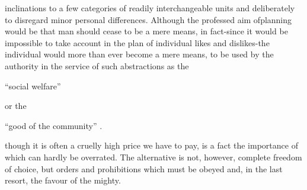 \documentclass[11pt,openany]{book}
\begin{document}
inclinations to a few categories of readily interchangeable units and deliberately to disregard minor personal differences. Although the professed aim ofplanning would be that man should cease to be a mere means, in fact-since it would be impossible to take account in the plan of individual likes and dislikes-the individual would more than ever become a mere means, to be used by the authority in the service of such abstractions as the

``social welfare''

or the

``good of the community'' .

\begin{center}\textasteriskcentered\hspace{0.9em}\textasteriskcentered\hspace{0.9em}\textasteriskcentered\end{center}

\begin{center}\textasteriskcentered\hspace{0.9em}\textasteriskcentered\hspace{0.9em}\textasteriskcentered\end{center}

\begin{center}\textasteriskcentered\hspace{0.9em}\textasteriskcentered\hspace{0.9em}\textasteriskcentered\end{center}

\begin{center}\textasteriskcentered\hspace{0.9em}\textasteriskcentered\hspace{0.9em}\textasteriskcentered\end{center}

\begin{center}\textasteriskcentered\hspace{0.9em}\textasteriskcentered\hspace{0.9em}\textasteriskcentered\end{center}

though it is often a cruelly high price we have to pay, is a fact the importance of which can hardly be overrated. The alternative is not, however, complete freedom of choice, but orders and prohibitions which must be obeyed and, in the last resort, the favour of the mighty.
\end{document}
